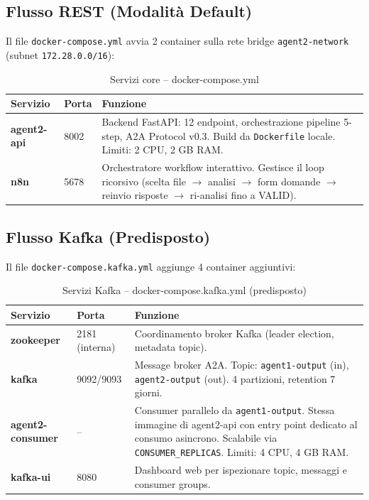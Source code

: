 \documentclass[12pt,a4paper]{report}
\begin{document}
\subsection{Flusso REST (Modalità Default)}

Il file \texttt{docker-compose.yml} avvia 2 container sulla rete bridge
\texttt{agent2-network} (subnet \texttt{172.28.0.0/16}):

\begin{table}[H]
\centering
\renewcommand{\arraystretch}{1.3}
\begin{tabular}{llp{7cm}}
\toprule
\textbf{Servizio} & \textbf{Porta} & \textbf{Funzione} \\
\midrule
\textbf{agent2-api} & 8002 & Backend FastAPI: 12 endpoint, orchestrazione pipeline 5-step, A2A Protocol v0.3. Build da \texttt{Dockerfile} locale. Limiti: 2 CPU, 2 GB RAM. \\
\textbf{n8n} & 5678 & Orchestratore workflow interattivo. Gestisce il loop ricorsivo (scelta file $\rightarrow$ analisi $\rightarrow$ form domande $\rightarrow$ reinvio risposte $\rightarrow$ ri-analisi fino a VALID). \\
\bottomrule
\end{tabular}
\caption{Servizi core -- docker-compose.yml}
\label{tab:core-services}
\end{table}

\subsection{Flusso Kafka (Predisposto)}

Il file \texttt{docker-compose.kafka.yml} aggiunge 4 container aggiuntivi:

\begin{table}[H]
\centering
\renewcommand{\arraystretch}{1.3}
\begin{tabular}{llp{6.5cm}}
\toprule
\textbf{Servizio} & \textbf{Porta} & \textbf{Funzione} \\
\midrule
\textbf{zookeeper} & 2181 (interna) & Coordinamento broker Kafka (leader election, metadata topic). \\
\textbf{kafka} & 9092/9093 & Message broker A2A. Topic: \texttt{agent1-output} (in), \texttt{agent2-output} (out). 4 partizioni, retention 7 giorni. \\
\textbf{agent2-consumer} & -- & Consumer parallelo da \texttt{agent1-output}. Stessa immagine di agent2-api con entry point dedicato al consumo asincrono. Scalabile via \texttt{CONSUMER\_REPLICAS}. Limiti: 4 CPU, 4 GB RAM. \\
\textbf{kafka-ui} & 8080 & Dashboard web per ispezionare topic, messaggi e consumer groups. \\
\bottomrule
\end{tabular}
\caption{Servizi Kafka -- docker-compose.kafka.yml (predisposto)}
\label{tab:kafka-services}
\end{table}
\end{document}
